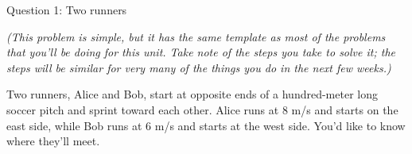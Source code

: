 \documentclass[12pt]{article}
\def\BS{\bigskip}
\begin{document}
\Large
\centerline{}
\normalsize
\centerline{}

\medskip

\centerline{\Large Question 1: Two runners}

\begin{center}
\it (This problem is simple, but it has the same template as most of the problems that you'll be doing for this unit. Take note of the steps you take to solve it; the steps will be similar for very many of the things you do in the next few weeks.)
\end{center}

\BS

Two runners, Alice and Bob, start at opposite ends of a hundred-meter long soccer pitch and sprint toward each other. Alice runs at 8 m/s and starts on the east side, while Bob runs at 6 m/s and starts at the west side. You'd like to know where they'll meet.
\end{document}
